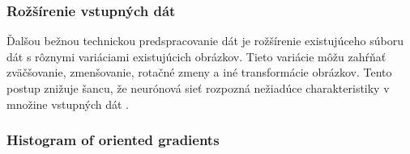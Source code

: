 \subsubsection{Rožšírenie vstupných dát}
Ďalšou bežnou technickou predspracovanie dát je rožšírenie existujúceho súboru dát s rôznymi variáciami existujúcich obrázkov.
Tieto variácie môžu zahŕňať zväčšovanie, zmenšovanie, rotačné zmeny a iné transformácie obrázkov.
Tento postup znižuje šancu, že neurónová sieť rozpozná nežiadúce charakteristiky v množine vstupných dát \cite{odkaz:NNPreprocessing}.

\subsubsection{Histogram of oriented gradients}

